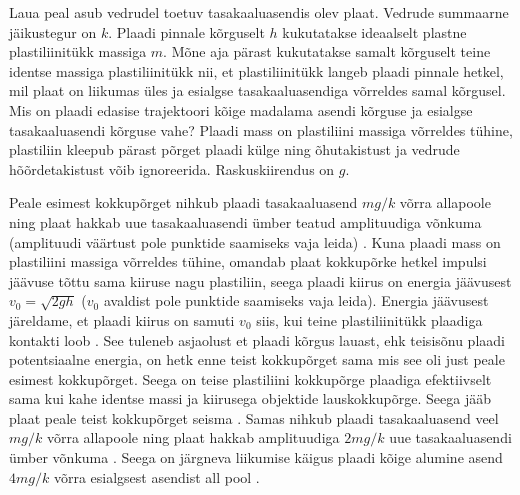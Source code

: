 
Laua peal asub vedrudel toetuv tasakaaluasendis olev plaat. Vedrude summaarne jäikustegur on $k$. Plaadi pinnale kõrguselt $h$ kukutatakse ideaalselt plastne plastiliinitükk massiga $m$. Mõne aja pärast kukutatakse samalt kõrguselt teine identse massiga plastiliinitükk nii, et plastiliinitükk langeb plaadi pinnale hetkel, mil plaat on liikumas üles ja esialgse tasakaaluasendiga võrreldes samal kõrgusel. Mis on plaadi edasise trajektoori kõige madalama asendi kõrguse ja esialgse tasakaaluasendi kõrguse vahe? Plaadi mass on plastiliini massiga võrreldes tühine, plastiliin kleepub pärast põrget plaadi külge ning õhutakistust ja vedrude hõõrdetakistust võib ignoreerida. Raskuskiirendus on $g$.



\hint

\solu
Peale esimest kokkupõrget nihkub plaadi tasakaaluasend $mg/k$ võrra allapoole ning plaat hakkab uue tasakaaluasendi ümber teatud amplituudiga võnkuma (amplituudi väärtust pole punktide saamiseks vaja leida) . Kuna plaadi mass on plastiliini massiga võrreldes tühine, omandab plaat kokkupõrke hetkel impulsi jäävuse tõttu sama kiiruse nagu plastiliin, seega plaadi kiirus on energia jäävusest $v_0 = \sqrt{2gh}$ ($v_0$ avaldist pole punktide saamiseks vaja leida). Energia jäävusest järeldame, et plaadi kiirus on samuti $v_0$ siis, kui teine plastiliinitükk plaadiga kontakti loob . See tuleneb asjaolust et plaadi kõrgus lauast, ehk teisisõnu plaadi potentsiaalne energia, on hetk enne teist kokkupõrget sama mis see oli just peale esimest kokkupõrget. Seega on teise plastiliini kokkupõrge plaadiga efektiivselt sama kui kahe identse massi ja kiirusega objektide lauskokkupõrge. Seega jääb plaat peale teist kokkupõrget seisma . Samas nihkub plaadi tasakaaluasend veel $mg/k$ võrra allapoole ning plaat hakkab amplituudiga $2mg/k$ uue tasakaaluasendi ümber võnkuma . Seega on järgneva liikumise käigus plaadi kõige alumine asend $4mg/k$ võrra esialgsest asendist all pool .
\probend